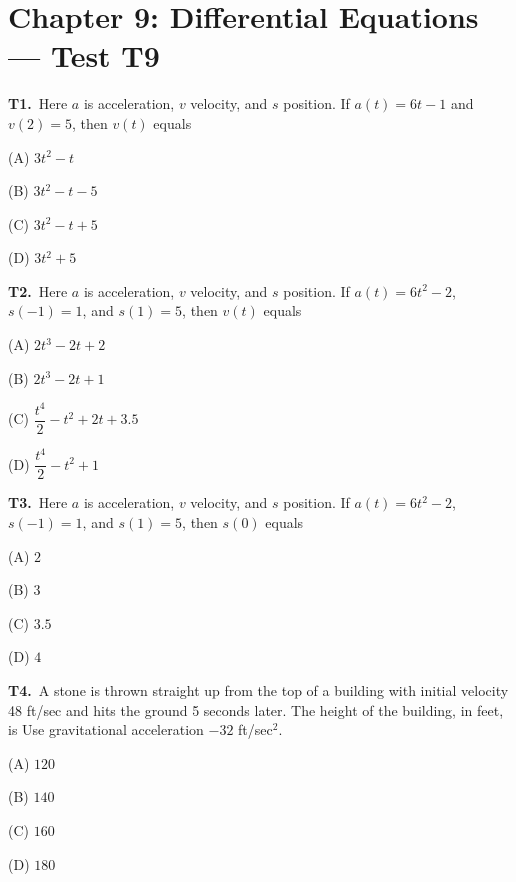 \documentclass[11pt]{article}
\begin{document}
\section*{Chapter 9: Differential Equations --- Test T9}

\bigskip\noindent\textbf{T1.}\ Here $a$ is acceleration, $v$ velocity, and $s$ position. If $a(t)=6t-1$ and $v(2)=5$, then $v(t)$ equals
\begin{list}{}{\setlength{\leftmargin}{3em}\setlength{\labelwidth}{2.5em}\setlength{\itemsep}{0pt}\setlength{\topsep}{2pt}}
\item[(A)] $3t^2-t$
\item[(B)] $3t^2-t-5$
\item[(C)] $3t^2-t+5$
\item[(D)] $3t^2+5$
\end{list}

\bigskip\noindent\textbf{T2.}\ Here $a$ is acceleration, $v$ velocity, and $s$ position. If $a(t)=6t^2-2$, $s(-1)=1$, and $s(1)=5$, then $v(t)$ equals
\begin{list}{}{\setlength{\leftmargin}{3em}\setlength{\labelwidth}{2.5em}\setlength{\itemsep}{0pt}\setlength{\topsep}{2pt}}
\item[(A)] $2t^3-2t+2$
\item[(B)] $2t^3-2t+1$
\item[(C)] $\dfrac{t^4}{2}-t^2+2t+3.5$
\item[(D)] $\dfrac{t^4}{2}-t^2+1$
\end{list}

\bigskip\noindent\textbf{T3.}\ Here $a$ is acceleration, $v$ velocity, and $s$ position. If $a(t)=6t^2-2$, $s(-1)=1$, and $s(1)=5$, then $s(0)$ equals
\begin{list}{}{\setlength{\leftmargin}{3em}\setlength{\labelwidth}{2.5em}\setlength{\itemsep}{0pt}\setlength{\topsep}{2pt}}
\item[(A)] $2$
\item[(B)] $3$
\item[(C)] $3.5$
\item[(D)] $4$
\end{list}

\bigskip\noindent\textbf{T4.}\ A stone is thrown straight up from the top of a building with initial velocity 48 ft/sec and hits the ground 5 seconds later. The height of the building, in feet, is Use gravitational acceleration $-32$ ft/sec$^2$.
\begin{list}{}{\setlength{\leftmargin}{3em}\setlength{\labelwidth}{2.5em}\setlength{\itemsep}{0pt}\setlength{\topsep}{2pt}}
\item[(A)] $120$
\item[(B)] $140$
\item[(C)] $160$
\item[(D)] $180$
\end{list}
\end{document}
